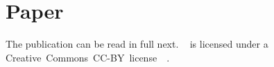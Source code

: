 
\section{Paper}

The publication can be read in full next.
\citeauthor{Oliveira_2020}~\cite{Oliveira_2020}
is licensed under a
Creative~Commons~CC-BY~license~\ccby~\cite{ACS_CCBY_2014}.


